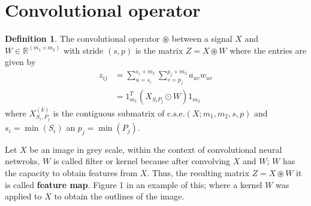 \documentclass{article}
\theoremstyle{definition}
\newtheorem{definition}{Definition}
\begin{document}
\section{Convolutional operator}
\begin{definition}
The convolutional operator  $\circledast$ between a signal $X$ and   $W\in\mathbb{R}^{(m_1\times m_2)}$  with stride $(s,p)$ is the matrix $Z =X\circledast W $ where the entries are given by 
\begin{equation*}
\begin{split}
z_{ij} &=\sum_{u=s_i}^{s_i+m_1}\sum_{v=p_j}^{p_j+m_2}a_{uv}w_{uv}\\
&=1_{m_1}^T(X_{S_i P_j}\odot W)1_{m_2}
\end{split}
\end{equation*}
where $X^{(k)}_{S_i,P_j}$ is the contiguous submatrix of $\mbox{c.s.e.}(X;m_1,m_2,s,p) $ and $s_i=\min(S_i)$ an $p_j=\min(P_j)$. 
\end{definition}
\noindent
Let $X$ be an image in grey scale, within the context of convolutional neural netwroks, $W$ is called filter or kernel because after convolving $X$ and $W$; $W$ has the capacity to obtain features from $X$. Thus, the resulting matrix $Z=X\circledast W$ it is called \textbf{feature map}. Figure 1 in an example of this; where a kernel $W$ was applied to $X$ to obtain the outlines of the image. 
\end{document}
